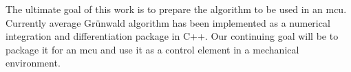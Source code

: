 The ultimate goal of this work is to prepare the algorithm to be used in an mcu. Currently average Gr{\"u}nwald algorithm has been implemented as a numerical integration and differentiation package in C++. Our continuing goal will be to package it for an mcu and use it as a control element in a mechanical environment.  